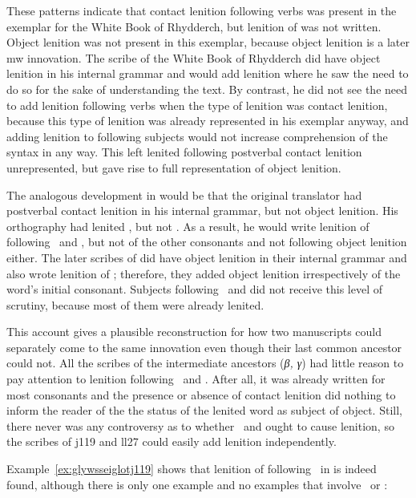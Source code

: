 These patterns indicate that contact lenition following verbs was present in the exemplar for the White Book of Rhydderch, but lenition of  was not written. Object lenition was not present in this exemplar, because object lenition is a later \gls{mw} innovation. The scribe of the White Book of Rhydderch did have object lenition in his internal grammar and would add lenition where he saw the need to do so for the sake of understanding the text. By contrast, he did not see the need to add lenition following verbs when the type of lenition was contact lenition, because this type of lenition was already represented in his exemplar anyway, and adding lenition to following subjects would not increase comprehension of the syntax  in any way. This left lenited  following postverbal contact lenition unrepresented, but gave rise to full representation of object lenition.

The analogous development in  would be that the original translator had postverbal contact lenition in his internal grammar, but not object lenition. His orthography had lenited , but not . As a result, he would write lenition of  following \ei\ and , but not of the other consonants and not following object lenition either. The later scribes of  did have object lenition in their internal grammar and also wrote lenition of ; therefore, they added object lenition irrespectively of the word's initial consonant. Subjects following \ei\ and  did not receive this level of scrutiny, because most of them were already lenited.

This account gives a plausible reconstruction for how two manuscripts could separately come to the same innovation even though their last common ancestor could not. All the scribes of the intermediate ancestors (\textit{β, γ}) had little reason to pay attention to lenition following \ei\ and . After all, it was already written for most consonants and the presence or absence of contact lenition did nothing to inform the reader of the the status of the lenited word as subject of object. Still, there never was any controversy as to whether \ei\ and  ought to cause lenition, so the scribes of \gls{j119} and \gls{ll27} could easily add lenition independently.

Example~\ref{ex:glywsseiglotj119} shows that  lenition of  following \ei\ in  is indeed found, although there is only one example and no examples that involve \oes\ or :

